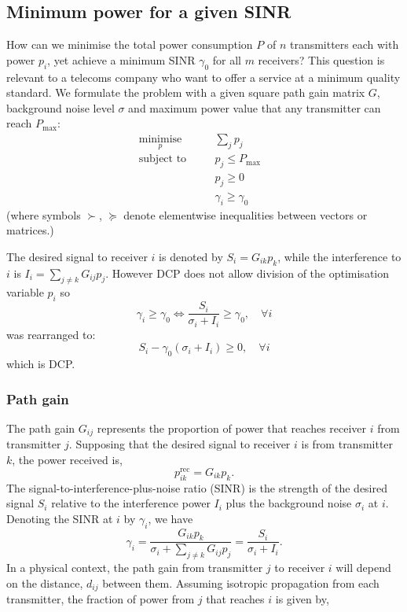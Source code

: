 \documentclass[twocolumn,secnumarabic,amssymb, nobibnotes, aps, prl,superscriptaddress]{revtex4-1}
\begin{document}
\subsection{Minimum power for a given SINR}
How can we minimise the total power consumption $P$ of $n$ transmitters each with power $p_i$, yet achieve a minimum SINR $\gamma_0$ for all $m$ receivers? This question is relevant to a telecoms company who want to offer a service at a minimum quality standard. We formulate the problem with a given square path gain matrix $G$, background noise level $\sigma$ and maximum power value that any transmitter can reach $P_{\text{max}}$:
		\begin{align*}
				&\underset{p}{\text{minimise}} \quad &&\sum_j p_j\\
				&\text{subject to} \quad &&p_j \leq P_{\max}\\
				& \quad &&p_j \geq 0\\
				& \quad &&\gamma_i \geq \gamma_0&&
		\end{align*}
(where symbols $\succ$, $\succeq$ denote elementwise inequalities between vectors or matrices.)

The desired signal to receiver $i$ is denoted by $S_i = G_{ik}p_k$, while the interference to $i$ is $I_i = \sum_{j\neq k}G_{ij}p_j$. However DCP does not allow division of the optimisation variable $p_i$ so  
\begin{equation*}
  \gamma_i \geq \gamma_0\Longleftrightarrow  \frac{S_i}{\sigma_i + I_i}\geq \gamma_0, \quad \forall i
\end{equation*}
was rearranged to:
\begin{equation*}
S_i-\gamma_0(\sigma_i + I_i)\geq 0, \quad \forall i
\end{equation*} which is DCP.
\subsubsection{Path gain}
The path gain $G_{ij}$ represents the proportion of power that reaches receiver $i$ from transmitter $j$. Supposing that the desired signal to receiver $i$ is from transmitter $k$, the power received is,
\begin{equation}
p_{ik}^{\text{rec}} = G_{ik}p_k.
\end{equation}
The signal-to-interference-plus-noise ratio (SINR) is the strength of the desired signal $S_i$ relative to the interference power $I_i$ plus the background noise $\sigma_i$ at $i$. Denoting the SINR at $i$ by $\gamma_i$, we have
\begin{equation}
\gamma_i = \frac{G_{ik}p_k}{\sigma_i+\sum_{j\neq k}G_{ij}p_j}
=\frac{S_i}{\sigma_i+I_i}.
\end{equation}
In a physical context, the path gain from transmitter $j$ to receiver $i$ will depend on the distance, $d_{ij}$ between them.  Assuming isotropic propagation from each transmitter, the fraction of power from $j$ that reaches $i$ is given by,
\end{document}
